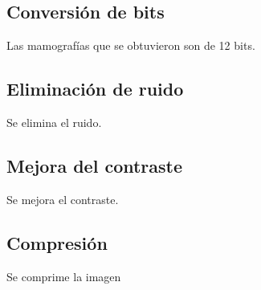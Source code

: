 \subsection{Conversión de bits}
Las mamografías que se obtuvieron son de 12 bits.

\subsection{Eliminación de ruido}
Se elimina el ruido.

\subsection{Mejora del contraste}
Se mejora el contraste.

\subsection{Compresión}
Se comprime la imagen

